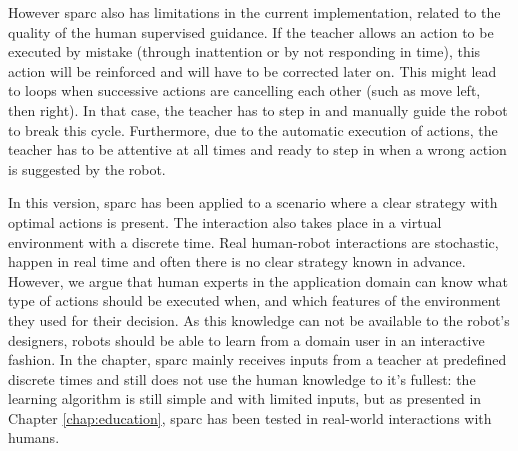 
However \gls{sparc} also has limitations in the current implementation, related to the quality of the human supervised guidance. If the teacher allows an action to be executed by mistake (through inattention or by not responding in time), this action will be reinforced and will have to be corrected later on. This might lead to loops when successive actions are cancelling each other (such as move left, then right). In that case, the teacher has to step in and manually guide the robot to break this cycle. Furthermore, due to the automatic execution of actions, the teacher has to be attentive at all times and ready to step in when a wrong action is suggested by the robot.

In this version, \gls{sparc} has been applied to a scenario where a clear strategy with optimal actions is present. The interaction also takes place in a virtual environment with a discrete time. Real human-robot interactions are stochastic, happen in real time and often there is no clear strategy known in advance. However, we argue that human experts in the application domain can know what type of actions should be executed when, and which features of the environment they used for their decision. As this knowledge can not be available to the robot's designers, robots should be able to learn from a domain user in an interactive fashion. In the chapter, \gls{sparc} mainly receives inputs from a teacher at predefined discrete times and still does not use the human knowledge to it's fullest: the learning algorithm is still simple and with limited inputs, but as presented in Chapter \ref{chap:education},  \gls{sparc} has been tested in real-world interactions with humans.


